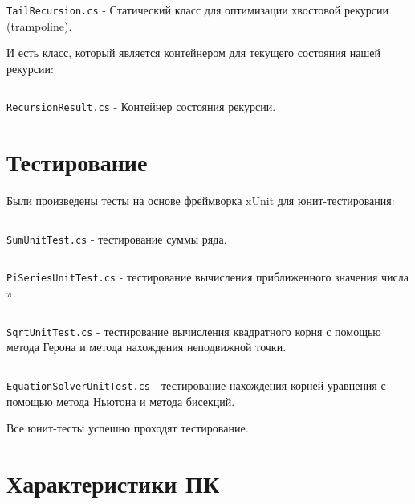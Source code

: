 \begin{code}
	\inputminted[tabsize=2,breaklines]{csharp}{src/Library/TailRecursion.cs}
	\caption{\texttt{TailRecursion.cs} - Статический класс для оптимизации хвостовой рекурсии (trampoline).}
\end{code}

И есть класс, который является контейнером для текущего состояния нашей рекурсии:

\begin{code}
	\inputminted[tabsize=2,breaklines]{csharp}{src/Library/RecursionResult.cs}
	\caption{\texttt{RecursionResult.cs} - Контейнер состояния рекурсии.}
\end{code}

\newpage
\section{Тестирование}

Были произведены тесты на основе фреймворка xUnit для юнит-тестирования:

\begin{code}
	\inputminted[tabsize=2,breaklines]{csharp}{src/Tests/SumUnitTest.cs}
	\caption{\texttt{SumUnitTest.cs} - тестирование суммы ряда.}
\end{code}

\begin{code}
	\inputminted[tabsize=2,breaklines]{csharp}{src/Tests/PiSeriesUnitTest.cs}
	\caption{\texttt{PiSeriesUnitTest.cs} - тестирование вычисления приближенного значения числа $\pi$.}
\end{code}

\begin{code}
	\inputminted[tabsize=2,breaklines]{csharp}{src/Tests/SqrtUnitTest.cs}
	\caption{\texttt{SqrtUnitTest.cs} - тестирование вычисления квадратного корня с помощью метода Герона и метода нахождения неподвижной точки.}
\end{code}

\begin{code}
	\inputminted[tabsize=2,breaklines]{csharp}{src/Tests/EquationSolverUnitTest.cs}
	\caption{\texttt{EquationSolverUnitTest.cs} - тестирование нахождения корней уравнения с помощью метода Ньютона и метода бисекций.}
\end{code}

Все юнит-тесты успешно проходят тестирование.

\newpage
\section{Характеристики ПК}

